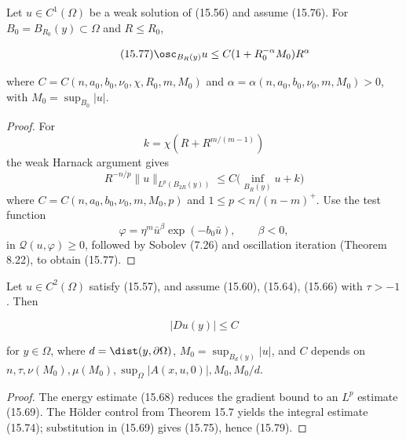 \begin{theorem}\label{gilbarg-trudinger.thm.15.7.weak-solution-holder}
Let $u\in C^1(\Omega)$ be a weak solution of (15.56) and assume (15.76).
For $B_0=B_{R_0}(y)\subset\Omega$ and $R\leq R_0$,

\begin{equation}
\tag{15.77}
\osc_{B_R(y)} u \leq C(1+R_0^{-\alpha}M_0)R^\alpha
\end{equation}

where $C=C(n,a_0,b_0,\nu_0,\chi,R_0,m,M_0)$ and
$\alpha=\alpha(n,a_0,b_0,\nu_0,m,M_0)>0$, with $M_0=\sup_{B_0}|u|$.
\end{theorem}

\begin{proof}
\sketch For
\[
k=\chi(R+R^{m/(m-1)})
\]
the weak Harnack argument gives
\begin{equation}
\tag{15.78}
R^{-n/p}\|u\|_{L^p(B_{2R}(y))}\leq C\bigl(\inf_{B_R(y)} u+k\bigr)
\end{equation}
where \(C=C(n,a_0,b_0,\nu_0,m,M_0,p)\) and \(1\le p<n/(n-m)^+\). Use
the test function
\[
\varphi=\eta^m \bar{u}^{\beta} \exp(-b_0\bar{u}), \qquad \beta<0,
\]
in \(\mathcal Q(u,\varphi)\ge0\), followed by Sobolev (7.26) and oscillation
iteration (Theorem 8.22), to obtain (15.77).
\end{proof}

\begin{theorem}\label{gilbarg-trudinger.thm.15.8.divergence-interior-gradient}
Let $u\in C^2(\Omega)$ satisfy (15.57), and assume (15.60), (15.64), (15.66)
with $\tau>-1$. Then

\begin{equation}
\tag{15.79}
|Du(y)|\leq C
\end{equation}


for $y\in\Omega$, where $d=\dist(y,\partial\Omega)$,
$M_0=\sup_{B_d(y)}|u|$, and $C$ depends on
$n,\tau,\nu(M_0),\mu(M_0),\sup_\Omega|A(x,u,0)|,M_0,M_0/d$.
\end{theorem}
\begin{proof}
\sketch The energy estimate (15.68) reduces the gradient bound to an $L^p$ estimate
(15.69). The H\"older control from Theorem 15.7 yields the integral estimate (15.74);
substitution in (15.69) gives (15.75), hence (15.79).
\end{proof}

